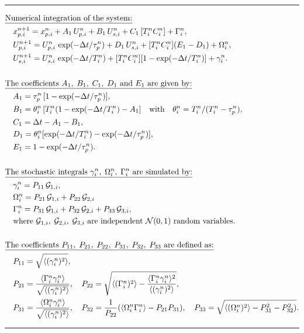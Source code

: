 \begin{table}[htbp]
\caption{Weak first-order scheme (Euler scheme)}
\hrule
\begin{align}
& \text{\underline{Numerical integration of the system:}}\notag \\
& \quad x_{p,i}^{n+1} = x_{p,i}^n + A_1\,U_{p,i}^n + B_1\,U_{s,i}^n
  + C_1\,[T_i^n C_i^n] + \Gamma _i^n,
  \notag \\
& \quad U_{p,i}^{n+1} = U_{p,i}^n\, \exp(-\Delta t/\tau_p^n)
              + D_1\,U_{s,i}^n + [T_i^n C_i^n](E_1-D_1)
              + \Omega _i^n, \notag \\
& \quad U_{s,i}^{n+1} = U_{s,i}^n\, \exp(-\Delta t/T_i^n)
              + [T_i^n C_i^n] [1-\exp(-\Delta t/T_i^n)]
              + \gamma _i^n.\notag \\ \notag \\
& \text{\underline{The coefficients $A_1,\;B_1,\;C_1,\;D_1$ and $E_1$ are
  given by:}}\notag \\
& \quad A_1 = \tau_p^n\,[1-\exp(-\Delta t/\tau_p^n)],\notag\\
& \quad B_1 = \theta_i ^n\,[T_i^n(1-\exp(-\Delta t/T_i^n)-A_1]
      \quad \text{with}\quad \theta_i ^n = T_i^n/(T_i^n-\tau_p^n),\notag\\
& \quad C_1 = \Delta t - A_1 - B_1, \notag \\
& \quad D_1 = \theta_i ^n [\exp(-\Delta t/T_i^n)-\exp(-\Delta
  t/\tau_p^n)],\notag\\
& \quad E_1 = 1 - \exp(-\Delta t/\tau_p^n).\notag \\ \notag \\
& \text{\underline{The stochastic integrals $\gamma _i^n,\;\Omega
_i^n,\;\Gamma_i^n$ are simulated by:}}\notag \\
& \quad \gamma_i^n = P_{11}\,{\mathcal G}_{1,i},\notag \\
& \quad \Omega_i^n = P_{21}\,{\mathcal G}_{1,i}+ P_{22}\,{\mathcal G}_{2,i} \notag \\
& \quad \Gamma_i^n = P_{31}\,{\mathcal G}_{1,i}+ P_{32}\,{\mathcal G}_{2,i}+
                     P_{33}\,{\mathcal G}_{3,i}, \notag\\
& \quad \text{where ${\mathcal G}_{1,i},\;{\mathcal G}_{2,i},\;{\mathcal G}_{3,i}$ are
  independent ${\cal N}(0,1)$ random variables.} \notag\\ \notag \\
& \text{\underline{The coefficients
 $P_{11},\;P_{21},\;P_{22},\;P_{31},\;P_{32},\;P_{33}$ are defined
 as:}}\notag\\
& \quad P_{11} = \sqrt{\langle (\gamma_i^n)^2 \rangle}, \notag \\
& \quad P_{21} = \frac{\langle \Gamma_i^n\gamma_i^n \rangle}{\sqrt{\langle (\gamma_i^n)^2 \rangle}},
  \quad P_{22} = \sqrt{\langle (\Gamma_i^n)^2 \rangle-
  \frac{\langle \Gamma_i^n\gamma_i^n \rangle^2}{\langle (\gamma_i^n)^2 \rangle}},\notag \\
& \quad P_{31} = \frac{\langle \Omega_i^n\gamma_i^n \rangle}{\sqrt{\langle (\gamma_i^n)^2 \rangle}},
  \quad P_{32} = \frac{1}{P_{22}}(\langle \Omega_i^n\Gamma_i^n \rangle-P_{21}P_{31}),
  \quad P_{33} = \sqrt{\langle (\Omega_i^n)^2 \rangle-P_{31}^2-P_{32}^2)}.\notag
\end{align}
\hrule
\label{tab:lagrangian:sch1}
\end{table}

